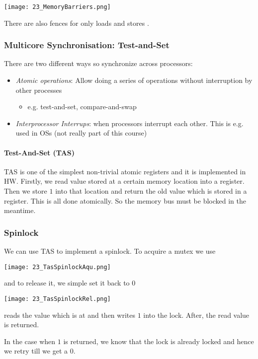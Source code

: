 \texttt{[image: 23\_MemoryBarriers.png]}

There are also fences for only loads  and stores .

\subsubsection{Multicore Synchronisation: Test-and-Set}
There are two different ways so synchronize across processors:

\begin{itemize}
    \item \textit{Atomic operations}: Allow doing a series of operations without interruption by other processes
        \begin{itemize}
            \item e.g. test-and-set, compare-and-swap
        \end{itemize}
    \item \textit{Interprocessor Interrups}: when processors interrupt each other. This is e.g. used in OSs (not really part of this course)
\end{itemize}

\paragraph{Test-And-Set (TAS)}
TAS is one of the simplest non-trivial atomic registers and it is implemented in HW. Firstly, we read value stored at a certain memory location into a register. Then we store $1$ into that location and return the old value which is stored in a register. This is all done atomically. So the memory bus must be blocked in the meantime.

\subsubsection{Spinlock}
We can use TAS to implement a spinlock. To acquire a mutex we use

\texttt{[image: 23\_TasSpinlockAqu.png]}

and to release it, we simple set it back to $0$

\texttt{[image: 23\_TasSpinlockRel.png]}

 reads the value which is at  and then writes $1$ into the lock. After, the read value is returned.

In the case when $1$ is returned, we know that the lock is already locked and hence we retry till we get a $0$.

